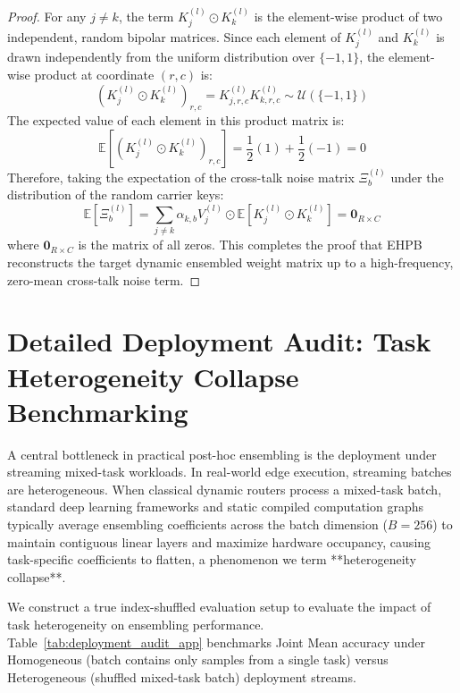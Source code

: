\documentclass{article}
\theoremstyle{plain}
\theoremstyle{definition}
\theoremstyle{remark}
\begin{document}
\begin{proof}
For any $j \neq k$, the term $K_j^{(l)} \odot K_k^{(l)}$ is the element-wise product of two independent, random bipolar matrices. Since each element of $K_j^{(l)}$ and $K_k^{(l)}$ is drawn independently from the uniform distribution over $\{-1, 1\}$, the element-wise product at coordinate $(r, c)$ is:
\begin{equation}
\left( K_j^{(l)} \odot K_k^{(l)} \right)_{r, c} = K_{j, r, c}^{(l)} K_{k, r, c}^{(l)} \sim \mathcal{U}(\{-1, 1\})
\end{equation}
The expected value of each element in this product matrix is:
\begin{equation}
\mathbb{E} \left[ \left( K_j^{(l)} \odot K_k^{(l)} \right)_{r, c} \right] = \frac{1}{2}(1) + \frac{1}{2}(-1) = 0
\end{equation}
Therefore, taking the expectation of the cross-talk noise matrix $\Xi_b^{(l)}$ under the distribution of the random carrier keys:
\begin{equation}
\mathbb{E} \left[ \Xi_b^{(l)} \right] = \sum_{j \neq k} \alpha_{k, b} V_j^{(l)} \odot \mathbb{E} \left[ K_j^{(l)} \odot K_k^{(l)} \right] = \mathbf{0}_{R \times C}
\end{equation}
where $\mathbf{0}_{R \times C}$ is the matrix of all zeros. This completes the proof that EHPB reconstructs the target dynamic ensembled weight matrix up to a high-frequency, zero-mean cross-talk noise term.
\end{proof}

\section{Detailed Deployment Audit: Task Heterogeneity Collapse Benchmarking}
\label{app:deployment_audit}

A central bottleneck in practical post-hoc ensembling is the deployment under streaming mixed-task workloads. In real-world edge execution, streaming batches are heterogeneous. When classical dynamic routers process a mixed-task batch, standard deep learning frameworks and static compiled computation graphs typically average ensembling coefficients across the batch dimension ($B=256$) to maintain contiguous linear layers and maximize hardware occupancy, causing task-specific coefficients to flatten, a phenomenon we term **heterogeneity collapse**.

We construct a true index-shuffled evaluation setup to evaluate the impact of task heterogeneity on ensembling performance. Table~\ref{tab:deployment_audit_app} benchmarks Joint Mean accuracy under Homogeneous (batch contains only samples from a single task) versus Heterogeneous (shuffled mixed-task batch) deployment streams.
\end{document}
